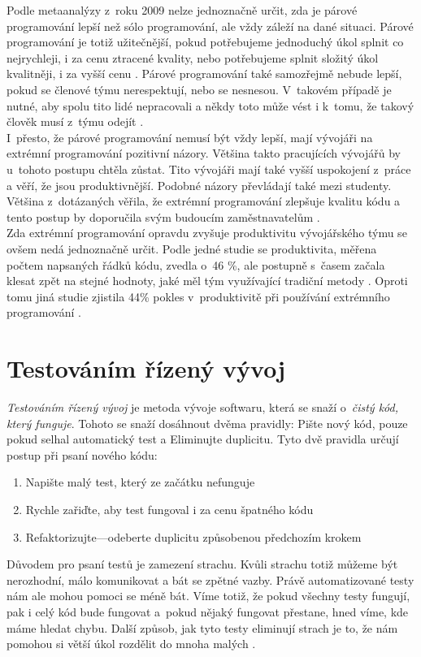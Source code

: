 \documentclass[12pt]{report}
\begin{document}
		Podle metaanalýzy z~roku 2009 nelze jednoznačně určit, zda je párové programování lepší než sólo programování, ale vždy záleží na dané situaci. Párové programování je totiž užitečnější, pokud potřebujeme jednoduchý úkol splnit co nejrychleji, i za cenu ztracené kvality, nebo potřebujeme splnit složitý úkol kvalitněji, i za vyšší cenu \cite{Hannay2009}. Párové programování také samozřejmě nebude lepší, pokud se členové týmu nerespektují, nebo se nesnesou. V~takovém případě je nutné, aby spolu tito lidé nepracovali a někdy toto může vést i k~tomu, že takový člověk musí z~týmu odejít \cite{Beck2002}.\\
		
		I~přesto, že párové programování nemusí být vždy lepší, mají vývojáři na extrémní programování pozitivní názory. Většina takto pracujících vývojářů by u~tohoto postupu chtěla zůstat. Tito vývojáři mají také vyšší uspokojení z~práce a věří, že jsou produktivnější. Podobné názory převládají také mezi studenty. Většina z~dotázaných věřila, že extrémní programování zlepšuje kvalitu kódu a tento postup by doporučila svým budoucím zaměstnavatelům \cite{Dybaa2008}.\\
		
		Zda extrémní programování opravdu zvyšuje produktivitu vývojářského týmu se ovšem nedá jednoznačně určit. Podle jedné studie se produktivita, měřena počtem napsaných řádků kódu, zvedla o~46 \%, ale postupně s~časem začala klesat zpět na stejné hodnoty, jaké měl tým využívající tradiční metody \cite{Ilieva2004}. Oproti tomu jiná studie zjistila 44\% pokles v~produktivitě při používání extrémního programování \cite{Dybaa2008}.\\

\section{Testováním řízený vývoj}
\textit{Testováním řízený vývoj} je metoda vývoje softwaru, která se snaží o~\textit{čistý kód, který funguje}. Tohoto se snaží dosáhnout dvěma pravidly: Pište nový kód, pouze pokud selhal automatický test a Eliminujte duplicitu. Tyto dvě pravidla určují postup při psaní nového kódu:
\begin{enumerate}
  \item Napište malý test, který ze začátku nefunguje
  \item Rychle zařiďte, aby test fungoval i za cenu špatného kódu
  \item Refaktorizujte—odeberte duplicitu způsobenou předchozím krokem
\end{enumerate}
Důvodem pro psaní testů je zamezení strachu. Kvůli strachu totiž můžeme být nerozhodní, málo komunikovat a bát se zpětné vazby. Právě automatizované testy nám ale mohou pomoci se méně bát. Víme totiž, že pokud všechny testy fungují, pak i celý kód bude fungovat a~pokud nějaký fungovat přestane, hned víme, kde máme hledat chybu. Další způsob, jak tyto testy eliminují strach je to, že nám pomohou si větší úkol rozdělit do mnoha malých \cite{Beck2015}.\\
\end{document}
